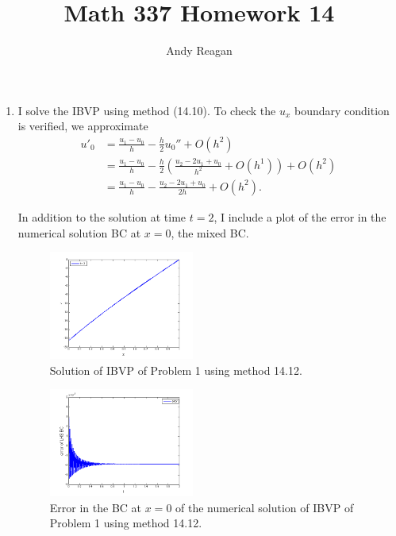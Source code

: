 \documentclass[11pt]{article}
\author{Andy Reagan}
\title{Math 337 Homework 14}
\def\f{\frac }
\newcommand{\oh}[1]{O(h^{{#1}})}
\begin{document}
\maketitle

\begin{enumerate}

\item I solve the IBVP using method (14.10). To check the $u_x$ boundary condition is verified, we approximate
\begin{align*} u'_0 &= \f{u_1-u_0}{h} - \f{h}{2} u_0 '' + \oh{2}\\
&= \f{u_1-u_0}{h} -  \f{h}{2} \left ( \f{u_2 -2u_1 +u_0}{h^2} + \oh{1} \right ) + \oh{2}\\
&= \f{u_1-u_0}{h} -  \f{u_2 -2u_1 +u_0}{2h} + \oh{2} .\end{align*}

In addition to the solution at time $t=2$, I include a plot of the error in the numerical solution BC at $x = 0$, the mixed BC.



\begin{figure}[h!]
  \centering
    \includegraphics[width=0.45\textwidth]{andy_hw14_prb01_01.png}
  \caption{Solution of IBVP of Problem 1 using method 14.12.}
\end{figure}

\begin{figure}[h!]
  \centering
    \includegraphics[width=0.45\textwidth]{andy_hw14_prb01_03.png}
  \caption{Error in the BC at $x=0$ of the numerical solution of IBVP of Problem 1 using method 14.12.}
\end{figure}


\end{enumerate}
\end{document}
